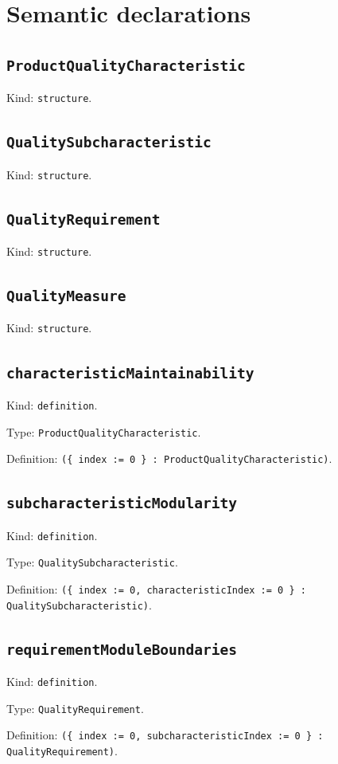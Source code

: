 \documentclass[11pt]{article}
\begin{document}
\section*{Semantic declarations}
\subsection*{\texttt{ProductQualityCharacteristic}}
\noindent Kind: \texttt{structure}.\par
\subsection*{\texttt{QualitySubcharacteristic}}
\noindent Kind: \texttt{structure}.\par
\subsection*{\texttt{QualityRequirement}}
\noindent Kind: \texttt{structure}.\par
\subsection*{\texttt{QualityMeasure}}
\noindent Kind: \texttt{structure}.\par
\subsection*{\texttt{characteristicMaintainability}}
\noindent Kind: \texttt{definition}.\par
\noindent Type: \texttt{ProductQualityCharacteristic}.\par
\noindent Definition: \texttt{(\{ index := 0 \} : ProductQualityCharacteristic)}.\par
\subsection*{\texttt{subcharacteristicModularity}}
\noindent Kind: \texttt{definition}.\par
\noindent Type: \texttt{QualitySubcharacteristic}.\par
\noindent Definition: \texttt{(\{ index := 0, characteristicIndex := 0 \} : QualitySubcharacteristic)}.\par
\subsection*{\texttt{requirementModuleBoundaries}}
\noindent Kind: \texttt{definition}.\par
\noindent Type: \texttt{QualityRequirement}.\par
\noindent Definition: \texttt{(\{ index := 0, subcharacteristicIndex := 0 \} : QualityRequirement)}.\par
\end{document}
